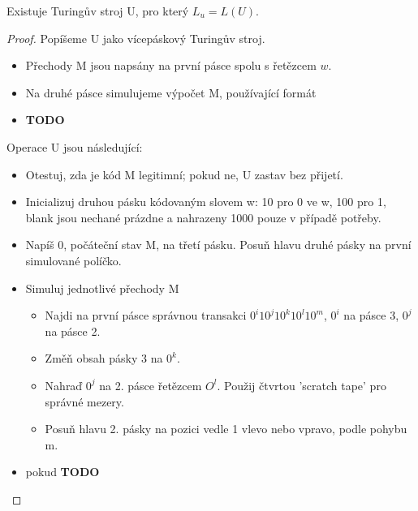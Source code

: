 \documentclass[../main.tex]{subfiles}
\begin{document}
\begin{theorem}
    Existuje Turingův stroj U, pro který $L_u = L(U)$.
    \begin{proof}
        Popíšeme U jako vícepáskový Turingův stroj.
        \begin{itemize}
            \item Přechody M jsou napsány na první pásce spolu s řetězcem $w$.
            \item Na druhé pásce simulujeme výpočet M, používající formát
            \item \textbf{TODO}
        \end{itemize}
        Operace U jsou následující:
        \begin{itemize}
            \item Otestuj, zda je kód M legitimní; pokud ne, U zastav bez přijetí.
            \item Inicializuj druhou pásku kódovaným slovem w: 10 pro 0 ve w, 100 pro 1, blank jsou nechané prázdne a nahrazeny 1000 pouze v případě potřeby.
            \item Napíš 0, počáteční stav M, na třetí pásku. Posuň hlavu druhé pásky na první simulované políčko.
            \item Simuluj jednotlivé přechody M
            \begin{itemize}
                \item Najdi na první pásce správnou transakci $0^i10^j10^k10^l10^m$, $0^i$ na pásce 3, $0^j$ na pásce 2.
                \item Změň obsah pásky 3 na $0^k$.
                \item Nahraď $0^j$ na 2. pásce řetězcem $O^l$. Použij čtvrtou 'scratch tape' pro správné mezery.
                \item Posuň hlavu 2. pásky na pozici vedle 1 vlevo nebo vpravo, podle pohybu m. 
            \end{itemize}
            \item pokud \textbf{TODO}
        \end{itemize}
    \end{proof}
\end{theorem}
\end{document}

